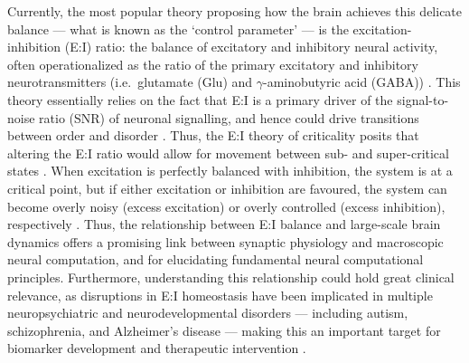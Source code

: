 \documentclass[
true
]{sn-jnl}
\begin{document}
Currently, the most popular theory proposing how the brain achieves this
delicate balance --- what is known as the `control parameter' --- is the
excitation-inhibition (E:I) ratio: the balance of excitatory and
inhibitory neural activity, often operationalized as the ratio of the
primary excitatory and inhibitory neurotransmitters (i.e.~glutamate
(Glu) and \(\gamma\)-aminobutyric acid (GABA))
\citep{liangExcitationInhibitionBalance2024, lombardiBalanceExcitationInhibition2017, baumgartenCriticalExcitationinhibitionBalance2019, bruiningMeasurementExcitationinhibitionRatio2020, trakoshisIntrinsicExcitationinhibitionImbalance, gaoInferringSynapticExcitation2017}.
This theory essentially relies on the fact that E:I is a primary driver
of the signal-to-noise ratio (SNR) of neuronal signalling, and hence
could drive transitions between order and disorder
\citep{liangExcitationInhibitionBalance2024, rubensteinModelAutismIncreased2003}.
Thus, the E:I theory of criticality posits that altering the E:I ratio
would allow for movement between sub- and super-critical states
\citep{liangExcitationInhibitionBalance2024}. When excitation is
perfectly balanced with inhibition, the system is at a critical point,
but if either excitation or inhibition are favoured, the system can
become overly noisy (excess excitation) or overly controlled (excess
inhibition), respectively \citep{liangExcitationInhibitionBalance2024}.
Thus, the relationship between E:I balance and large-scale brain
dynamics offers a promising link between synaptic physiology and
macroscopic neural computation, and for elucidating fundamental neural
computational principles. Furthermore, understanding this relationship
could hold great clinical relevance, as disruptions in E:I homeostasis
have been implicated in multiple neuropsychiatric and neurodevelopmental
disorders --- including autism, schizophrenia, and Alzheimer's disease
--- making this an important target for biomarker development and
therapeutic intervention
\citep{bruiningMeasurementExcitationinhibitionRatio2020, lauterbornIncreasedExcitatoryInhibitory2021, sohalExcitationinhibitionBalanceFramework2019}.
\end{document}
